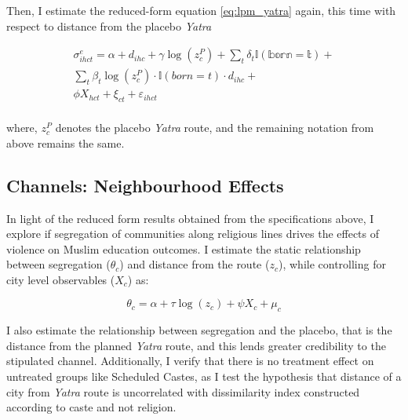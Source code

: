 \documentclass{article}
\begin{document}
Then, I estimate the reduced-form equation \eqref{eq:lpm_yatra} again, this time with respect to distance from the placebo \textit{Yatra}


\begin{equation}
\begin{split}\label{eq:lpm_yatra_p}
       \sigma_{ihct}^e = \alpha + d_{ihc} + \gamma \log(z_c^P) + \sum_{t}\delta_{t} \mathbb{I(born = t)} + \\
       \sum_{t} \beta_{t} \log(z_c^P) \cdot \mathbb{I} (born = t) \cdot d_{ihc}+ \\
       \phi X_{hct} + \xi_{ct} + \varepsilon_{ihct} \\
\end{split}
\end{equation}

where, $z_c^P$ denotes the placebo \textit{Yatra} route, and the remaining notation from above remains the same.

\subsection{Channels: Neighbourhood Effects}\label{channels}

In light of the reduced form results obtained from the specifications above, I explore if segregation of communities along religious lines drives the effects of violence on Muslim education outcomes. I estimate the static relationship between segregation ($\theta_c$) and distance from the route ($z_c$), while controlling for city level observables ($X_c$) as:

\begin{equation}\label{eq:fs}
    \theta_c = \alpha + \tau \log(z_c) + \psi X_{c} + \mu_c
\end{equation}

I also estimate the relationship between segregation and the placebo, that is the distance from the planned \textit{Yatra} route, and this lends greater credibility to the stipulated channel. Additionally, I verify that there is no treatment effect on untreated groups like Scheduled Castes, as I test the hypothesis that distance of a city from \textit{Yatra} route is uncorrelated with dissimilarity index constructed according to caste and not religion. 
\end{document}
